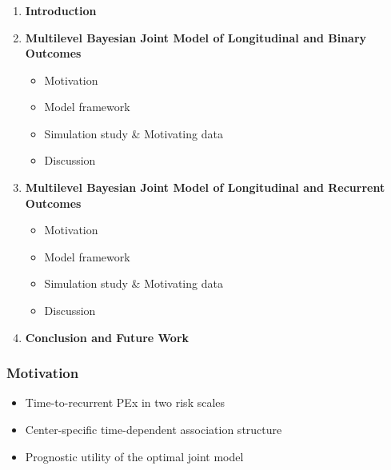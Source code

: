 \documentclass[fleqn]{beamer}
\begin{document}
\begin{frame}
\frametitle{}
\begin{enumerate}
    \item<0> \textbf{Introduction}
    \item<0> \textbf{Multilevel Bayesian Joint Model of Longitudinal and Binary Outcomes}
    \begin{itemize}
        \item Motivation
        \item Model framework
        \item Simulation study \& Motivating data
        \item Discussion
    \end{itemize}
    \item \textbf{Multilevel Bayesian Joint Model of Longitudinal and Recurrent Outcomes}
    \begin{itemize}
        \item Motivation
        \item Model framework
        \item Simulation study \& Motivating data
        \item Discussion
    \end{itemize}
    \item<0> \textbf{Conclusion and Future Work}
\end{enumerate}
\end{frame}


\begin{frame}
\frametitle{Motivation}
\begin{itemize}

    \item Time-to-recurrent PEx in two risk scales
    \item Center-specific time-dependent association structure
    \item Prognostic utility of the optimal joint model
    
\end{itemize}

\end{frame}
\end{document}
